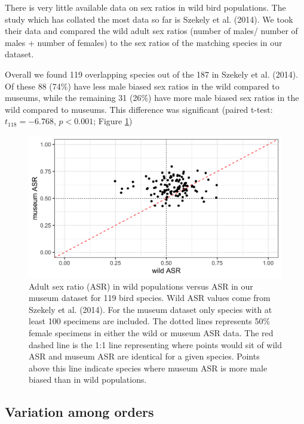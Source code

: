 \documentclass[a4paper, 12pt]{article}
\begin{document}
There is very little available data on sex ratios in wild bird populations. The study which has collated the most data so far is Szekely et al. (2014). We took their data and compared the wild adult sex ratios (number of males/ number of males + number of females) to the sex ratios of the matching species in our dataset.

Overall we found 119 overlapping species out of the 187 in Szekely et al. (2014)\cite{szekely2014sex}.
Of these 88 (74\%) have less male biased sex ratios in the wild compared to museums, while the remaining 31 (26\%) have more male biased sex ratios in the wild compared to museums. 
This difference was significant (paired t-test: $t_{118} = -6.768$, $p < 0.001$; Figure \ref{fig-asr})

\begin{figure}[H]
 \centering
  \includegraphics[width = \linewidth]{figures/wild-sex-ratios.png}
  \caption{Adult sex ratio (ASR) in wild populations versus ASR in our museum dataset for 119 bird species. 
  Wild ASR values come from Szekely et al. (2014)\cite{szekely2014sex}. 
  For the museum dataset only species with at least 100 specimens are included. 
  The dotted lines represents 50\% female specimens in either the wild or museum ASR data. 
  The red dashed line is the 1:1 line representing where points would sit of wild ASR and museum ASR are identical for a given species.
  Points above this line indicate species where museum ASR is more male biased than in wild populations.
}
  \label{fig-asr}
\end{figure}

\subsection*{Variation among orders}
\end{document}
